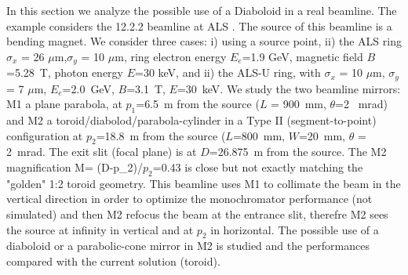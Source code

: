 \documentclass[a4paper, 11pt]{article}
\begin{document}
In this section we analyze the possible use of a Diaboloid in a real beamline. The example considers the 12.2.2 beamline at ALS \cite{bl1222}. The source of this beamline is a bending magnet. We consider three cases: i) using a source point, ii) the ALS ring
$\sigma_x$ = 26 $\mu$m,$\sigma_y$ = 10 $\mu$m, ring electron energy $E_e$=1.9 GeV, magnetic field $B$=5.28~T, photon energy $E$=30 keV, and ii) the ALS-U ring, with $\sigma_x$ = 10 $\mu$m, $\sigma_y$ = 7 $\mu$m, $E_e$=2.0~GeV, $B$=3.1~T, $E$=30~keV. We study the two beamline mirrors: M1 a plane parabola, at $p_1$=6.5~m from the source ($L$ = 900~mm, $\theta$=2 ~mrad) and M2 a toroid/diabolod/parabola-cylinder in a Type II (segment-to-point) configuration at $p_2$=18.8~m from the source ($L$=800~mm, $W$=20~mm, $\theta$ = 2~mrad. The exit slit (focal plane) is at $D$=26.875~m from the source.  The M2 magnification M= (D-p_2)/$p_2$=0.43 is close but not exactly matching the "golden" 1:2 toroid geometry. This beamline uses M1 to collimate the beam in the vertical direction in order to optimize the monochromator performance (not simulated) and then M2 refocus the beam at the entrance slit, therefre M2 sees the source at infinity in vertical and at $p_2$ in horizontal. The possible use of a diaboloid or a parabolic-cone mirror in M2 is studied and the performances compared with the current solution (toroid).
\end{document}
